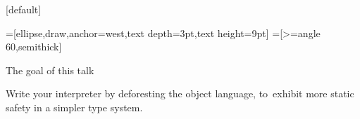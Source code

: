\documentclass[ucs,professionalfont]{beamer}
\begin{document}
\begin{frame}
\end{frame}
[default]


=[ellipse,draw,anchor=west,text depth=3pt,text height=9pt]
=[>=angle 60,semithick]

\begin{frame}{The goal of this talk}
    \begin{center}
        Write your interpreter by deforesting the object language,
        to~exhibit more static safety in a simpler type system.
    \end{center}
\end{frame}
\end{document}
